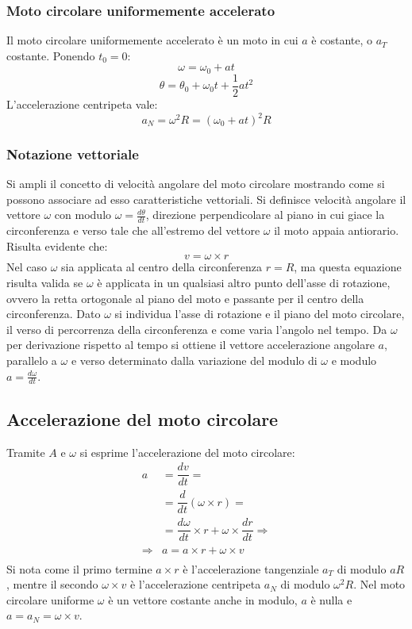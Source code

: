 \documentclass[class=book, crop=false, oneside, 12pt]{standalone}
\begin{document}
		\subsubsection{Moto circolare uniformemente accelerato}
		Il moto circolare uniformemente accelerato \`e un moto in cui $a$ \`e costante, o $a_T$ costante.
		Ponendo $t_0=0$:
		$$\omega=\omega_0+at$$
		$$\theta=\theta_0+\omega_0t+\dfrac{1}{2}at^2$$
		L'accelerazione centripeta vale:
		$$a_N=\omega^2R=(\omega_0+at)^2R$$
		\subsubsection{Notazione vettoriale}
		Si ampli il concetto di velocit\`a angolare del moto circolare mostrando come si possono associare ad esso caratteristiche vettoriali.
		Si definisce velocit\`a angolare il vettore $\omega$ con modulo $\omega=\frac{d\theta}{dt}$, direzione perpendicolare al piano in cui giace la circonferenza e verso tale che all'estremo del vettore $\omega$ il moto appaia antiorario.
		Risulta evidente che:
		$$v=\omega\times r$$
		Nel caso $\omega$ sia applicata al centro della circonferenza $r=R$, ma questa equazione risulta valida se $\omega$ \`e applicata in un qualsiasi altro punto dell'asse di rotazione, ovvero la retta ortogonale al piano del moto e passante per il centro della circonferenza.
		Dato $\omega$ si individua l'asse di rotazione e il piano del moto circolare, il verso di percorrenza della circonferenza e come varia l'angolo nel tempo.
		Da $\omega$ per derivazione rispetto al tempo si ottiene il vettore accelerazione angolare $a$, parallelo a $\omega$ e verso determinato dalla variazione del modulo di $\omega$ e modulo $a=\frac{d\omega}{dt}$.
	\subsection{Accelerazione del moto circolare}
		Tramite $A$ e $\omega$ si esprime l'accelerazione del moto circolare:
		\begin{align*}
			a&=\dfrac{dv}{dt}=\\
			 &=\dfrac{d}{dt}(\omega\times r)=\\
			 &=\dfrac{d\omega}{dt}\times r + \omega\times\dfrac{dr}{dt}\Rightarrow\\
			\Rightarrow&a=a\times r+\omega\times v\\
		\end{align*}
		Si nota come il primo termine $a\times r$ \`e l'accelerazione tangenziale $a_T$ di modulo $aR$, mentre il secondo $\omega\times v$ \`e l'accelerazione centripeta $a_N$ di modulo $\omega^2R$.
		Nel moto circolare uniforme $\omega$ \`e un vettore costante anche in modulo, $a$ \`e nulla e $a=a_N=\omega\times v$.
\end{document}

